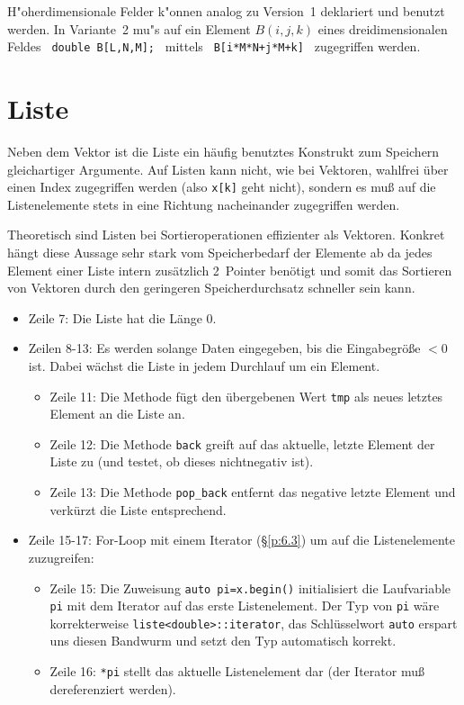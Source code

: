 H"oherdimensionale Felder k"onnen analog zu Version~1 deklariert und benutzt
werden. In Variante~2 mu"s auf ein Element $B(i,j,k)$ eines dreidimensionalen
Feldes  \verb| double B[L,N,M]; | mittels \verb| B[i*M*N+j*M+k] | zugegriffen
werden.
\fi                             %
%
%
%
%
%
\section{Liste}
\label{p:5.2}
%
Neben dem Vektor ist die Liste ein häufig benutztes Konstrukt zum
Speichern gleichartiger Argumente.
Auf Listen kann nicht, wie bei Vektoren, wahlfrei über einen Index zugegriffen werden
(also \verb|x[k]| geht nicht), sondern es muß auf die Listenelemente stets in
eine Richtung nacheinander zugegriffen werden.

Theoretisch sind Listen bei Sortieroperationen effizienter als Vektoren. 
Konkret hängt diese Aussage sehr stark vom Speicherbedarf der Elemente ab
da jedes Element einer Liste intern zusätzlich 2~Pointer benötigt 
und somit das Sortieren von Vektoren durch den geringeren Speicherdurchsatz schneller sein kann.
%
%
\begin{itemize}
    \item Zeile 7: Die Liste hat die Länge 0.
	\item Zeilen 8-13: Es werden solange Daten eingegeben, bis die Eingabegröße $<0$ ist. Dabei wächst die Liste
	in jedem Durchlauf um ein Element.
	\begin{itemize}
	  \item Zeile 11: Die Methode 
	  fügt den übergebenen Wert \texttt{tmp} als neues letztes Element an die Liste an.
	  \item Zeile 12: Die Methode \texttt{back} greift auf das aktuelle, letzte Element der Liste zu (und testet, ob
	  dieses nichtnegativ ist).
	  \item Zeile 13:  Die Methode \texttt{pop\_back} entfernt das negative letzte Element und verkürzt die Liste
	  entsprechend.
	\end{itemize}
	\item Zeile 15-17: For-Loop mit einem Iterator (\S\ref{p:6.3}) um auf die Listenelemente zuzugreifen:
    \begin{itemize}
        \item Zeile 15: Die Zuweisung \verb|auto pi=x.begin()| initialisiert die Laufvariable \verb|pi|
        mit dem Iterator auf das erste Listenelement.
        Der Typ von \verb|pi| wäre korrekterweise \verb|liste<double>::iterator|, das Schlüsselwort
        \verb|auto| erspart uns diesen Bandwurm und setzt den Typ automatisch korrekt.
        \item Zeile 16: \verb|*pi| stellt das aktuelle Listenelement dar
          (der Iterator muß dereferenziert werden).
    \end{itemize}
\end{itemize}

